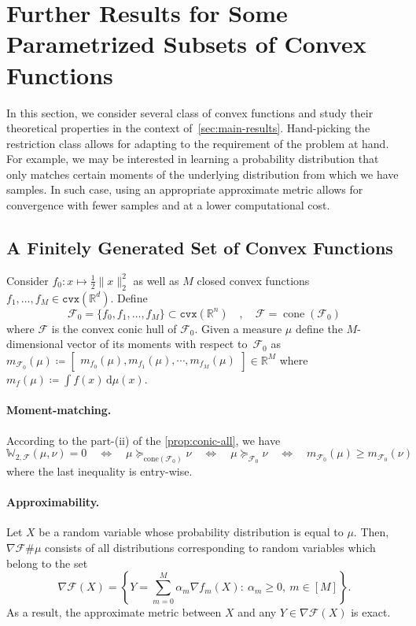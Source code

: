 \documentclass[10pt]{article}
\newcommand{\ud}{\,\mathrm{d}}
\newcommand{\op}[1]{\operatorname{#1}}
\newcommand{\norm}[1]{\|#1\|}
\newcommand{\cvx}{\mathtt{cvx}}
\newcommand{\real}{\mathbb{R}}
\newcommand{\W}{\mathds{W}}
\newcommand{\calF}{\mathcal{F}}
\numberwithin{equation}{section}
\begin{document}
\section{Further Results for Some Parametrized Subsets of Convex Functions}\label{sec:proposed-restr}%

In this section, we consider several class of convex functions and study their theoretical properties in the context of~\autoref{sec:main-results}. Hand-picking the restriction class allows for adapting to the requirement of the problem at hand. For example, we may be interested in learning a probability distribution that only matches certain moments of the underlying distribution from which we have samples. In such case, using an appropriate approximate metric allows for convergence with fewer samples and at a lower computational cost.


\subsection{A Finitely Generated Set of Convex Functions}\label{sec:restr-finite}
Consider $f_0:x\mapsto \frac{1}{2}\norm{x}_2^2$ as well as $M$ closed convex functions $f_1, \ldots, f_M \in \cvx(\real^d)$. Define 
\[
\calF_0 = \bigl\{f_0, f_1, \ldots, f_M \bigr\}\subset \cvx(\real^n) \quad,\quad \calF = \op{cone}(\calF_0)
\]
where $\calF$ is the convex conic hull of $\calF_0$. Given a measure $\mu$ define the $M$-dimensional vector of its moments with respect to~$\calF_0$ as $m_{\calF_0}(\mu) \coloneqq \begin{bmatrix} m_{f_0}(\mu) , m_{f_1}(\mu) , \cdots , m_{f_M}(\mu) \end{bmatrix} \in\real^{M}$ where $m_{f}(\mu)\coloneqq \int f(x) \ud \mu(x)$. 

\paragraph{Moment-matching.}
According to the part-(ii) of the \autoref{prop:conic-all}, we have
\begin{equation*}
\W_{2,\calF}(\mu,\nu) = 0\quad \iff\quad 
\mu \succeq_{\text{cone}(\calF_0)} \nu \quad \iff\quad 
\mu \succeq_{\calF_0} \nu \quad \iff\quad 
m_{\calF_0}(\mu) \geq m_{\calF_0}(\nu) 
\end{equation*}
where the last inequality is entry-wise. 


\paragraph{Approximability.} 
Let $X$ be a random variable whose probability distribution is equal to $\mu$. Then, $\nabla \calF \# \mu$ consists of all distributions corresponding to random variables which belong to the set 
\[\nabla \calF (X) = \left\{Y = \sum_{m=0}^M \alpha_m\nabla f_m(X):~\alpha_m \geq 0,~m \in [M]\right\}.\] As a result, the approximate metric between $X$ and any $Y \in \nabla \calF (X)$ is exact.
\end{document}
